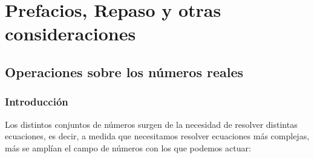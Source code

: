\part{Prefacios, Repaso y otras consideraciones}


\chapter{Operaciones sobre los números reales}
\minitoc

\newpage
\section*{Introducción} 

Los distintos conjuntos de números surgen de la necesidad de resolver distintas ecuaciones, es decir, a medida que necesitamos resolver ecuaciones más complejas, más se amplían el campo de números con los que podemos actuar:
 

